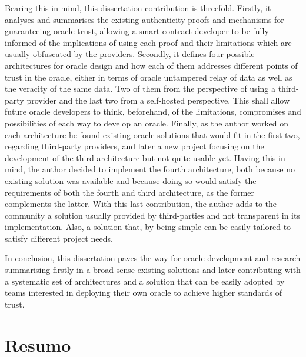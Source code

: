 Bearing this in mind, this dissertation contribution is threefold. Firstly, it analyses and summarises the existing authenticity proofs and mechanisms for guaranteeing oracle trust, allowing a smart-contract developer to be fully informed of the implications of using each proof and their limitations which are usually obfuscated by the providers. Secondly, it defines four possible architectures for oracle design and how each of them addresses different points of trust in the oracle, either in terms of oracle untampered relay of data as well as the veracity of the same data. Two of them from the perspective of using a third-party provider and the last two from a self-hosted perspective. This shall allow future oracle developers to think, beforehand, of the limitations, compromises and possibilities of each way to develop an oracle. Finally, as the author worked on each architecture he found existing oracle solutions that would fit in the first two, regarding third-party providers, and later a new project focusing on the development of the third architecture but not quite usable yet. Having this in mind, the author decided to implement the fourth architecture, both because no existing solution was available and because doing so would satisfy the requirements of both the fourth and third architecture, as the former complements the latter. With this last contribution, the author adds to the community a solution usually provided by third-parties and not transparent in its implementation. Also, a solution that, by being simple can be easily tailored to satisfy different project needs.

In conclusion, this dissertation paves the way for oracle development and research summarising firstly in a broad sense existing solutions and later contributing with a systematic set of architectures and a solution that can be easily adopted by teams interested in deploying their own oracle to achieve higher standards of trust.


\chapter*{Resumo}





